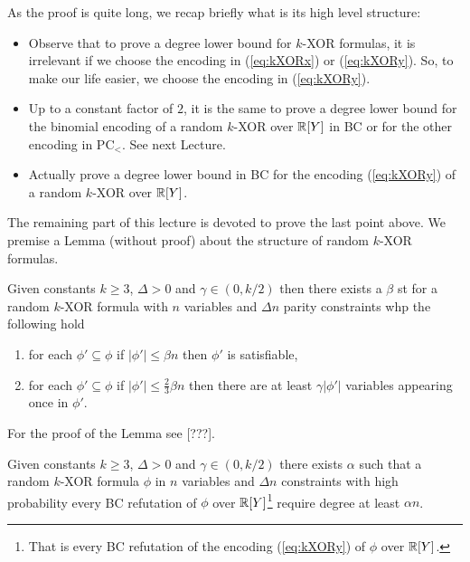 \documentclass[a4paper,twoside,justified]{tufte-handout}
\begin{document}
As the proof is quite long, we recap briefly what is its high level structure:
\begin{itemize}
\item Observe that to prove a degree lower bound for $k$-XOR formulas, it is irrelevant if we choose the encoding in (\ref{eq:kXORx}) or (\ref{eq:kXORy}). 
So, to make our life easier, we choose the encoding in (\ref{eq:kXORy}).
\item Up to a constant factor of $2$, it is the same to prove a degree lower bound for the binomial encoding of a random $k$-XOR over $\mathbb{R}[Y]$ in BC or for the other encoding in PC$_<$. See next Lecture.
\item Actually prove a degree lower bound in BC for the encoding (\ref{eq:kXORy}) of a random $k$-XOR over $\mathbb{R}[Y]$.
\end{itemize}

The remaining part of this lecture is devoted to prove the last point above. We premise a Lemma (without proof) about the structure of random $k$-XOR formulas.

\begin{lemma}\label{lem:kXORsat}
Given constants $k\geq 3$, $\Delta>0$ and $\gamma\in (0,k/2)$ then there exists a $\beta$ st for a random $k$-XOR formula with $n$ variables and $\Delta n$ parity constraints whp the following hold
\begin{enumerate}
\item for each $\phi'\subseteq \phi$ if $|\phi'|\leq \beta n$ then $\phi'$ is satisfiable,
\item for each $\phi'\subseteq \phi$ if $|\phi'|\leq \frac{2}{3}\beta n$ then there are at least $\gamma |\phi'|$ variables appearing once in $\phi'$.
\end{enumerate}

\end{lemma}
For the proof of the Lemma see [???].


\begin{theorem}
Given constants $k\geq 3$, $\Delta>0$ and $\gamma \in (0,k/2)$ there exists $\alpha$ such that a random $k$-XOR formula $\phi$ in $n$ variables and $\Delta n$ constraints with high probability every BC refutation of $\phi$ over $\mathbb{R}[Y]$\footnote{
That is every BC refutation of the encoding (\ref{eq:kXORy}) of $\phi$ over $\mathbb{R}[Y]$.
} 
require degree at least $\alpha n$.
\end{theorem}
\end{document}

